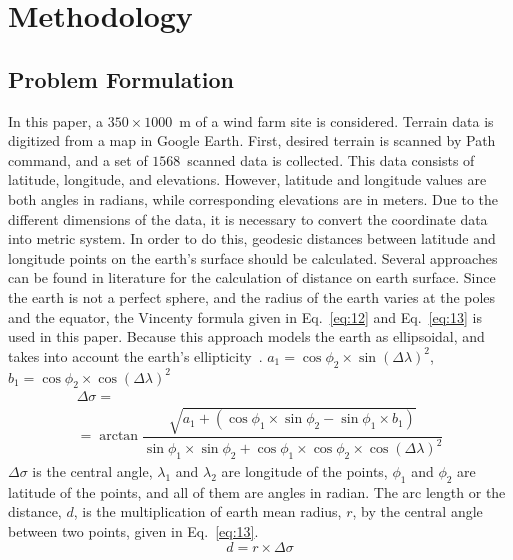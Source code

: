 \documentclass[]{iptconf}
\begin{document}
\section{Methodology} \label{sec:methodology}
\subsection{Problem Formulation} \label{subsec:problemformulation}
In this paper, a $350\times1000$~m of a wind farm site is considered. Terrain data is
digitized from a map in Google Earth. First, desired terrain is scanned by Path
command, and a set of $1568$~scanned data is collected. This data consists of
latitude, longitude, and elevations. However, latitude and longitude values are both
angles in radians, while corresponding elevations are in meters. Due to the different
dimensions of the data, it is necessary to convert the coordinate data into metric
system. In order to do this, geodesic distances between latitude and longitude points
on the earth's surface should be calculated.
Several approaches can be found in literature for the calculation of distance on
earth surface. Since the earth is not a perfect sphere, and the radius of the earth varies
at the poles and the equator, the Vincenty formula given in Eq.~\eqref{eq:12} and Eq.~\eqref{eq:13} 
is used in this paper. Because this approach models the earth as ellipsoidal, and takes
into account the earth's ellipticity~\cite{Veness2017}. $a_1=\cos\phi_2\times\sin(\varDelta\lambda)^2$, 
$b_1=\cos\phi_2\times\cos(\varDelta\lambda)^2$
\begin{multline}\label{eq:12}
	\varDelta\sigma=\\
	=\arctan\dfrac{\sqrt{a_1+(\cos\phi_1\times\sin\phi_2-\sin\phi_1\times b_1)}}{\sin\phi_1\times\sin\phi_2+\cos\phi_1\times\cos\phi_2\times\cos(\varDelta\lambda)^2}
\end{multline}
$\varDelta\sigma$ is the central angle, $\lambda_1$ and $\lambda_2$ are longitude of the points, $\phi_1$ and $\phi_2$ are latitude
of the points, and all of them are angles in radian. The arc length or the distance,
$d$, is the multiplication of earth mean radius, $r$, by the central angle between two
points, given in Eq.~\eqref{eq:13}.
\begin{equation}
	\label{eq:13}
	d=r\times\varDelta\sigma
\end{equation}
\end{document}
